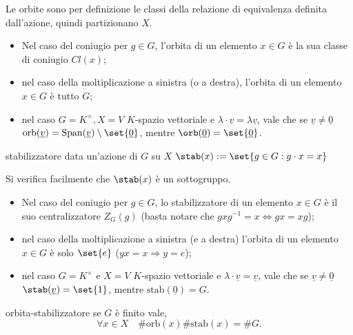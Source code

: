 Le orbite sono per definizione le classi della relazione di equivalenza definita dall'azione, quindi partizionano $X$.
\begin{itemize}
    \item Nel caso del coniugio per $g \in G$, l'orbita di un elemento $x \in G$ è la sua classe di coniugio $Cl(x)$;
    \item nel caso della moltiplicazione a sinistra (o a destra), l'orbita di un elemento $x \in G$ è tutto $G$;
    \item nel caso $G = K^\times, X = V$ $K$-spazio vettoriale e $\lambda \cdot \underline{v} = \lambda\underline{v}$, vale che se $\underline{v} \neq \underline{0}$ $\text{orb}(\underline{v}) = \text{Span}(\underline{v}) \setminus \set{\underline{0}}$, mentre $\orb(\underline{0}) = \set{\underline{0}}$.
    \end{itemize}
\begin{definition}{stabilizzatore}
    data un'azione di $G$ su $X$ $\stab(x) := \set{g \in G : g \cdot x = x} $
\end{definition} 
Si verifica facilmente che $\stab(x)$ è un sottogruppo.
\begin{itemize}
    \item Nel caso del coniugio per $g \in G$, lo stabilizzatore di un elemento $x \in G$ è il suo centralizzatore $Z_G(g)$ (basta notare che $gxg^{-1} = x \Longleftrightarrow gx = xg$);
    \item nel caso della moltiplicazione a sinistra (e a destra) l'orbita di un elemento $x \in G$ è solo $\set{e}$ ($yx = x \Rightarrow y = e$);
    \item nel caso $G = K^\times$ e $X = V$ $K$-spazio vettoriale e $\lambda \cdot \underline{v} = \underline{v}$, vale che se $\underline{v} \neq \underline{0}$ $\stab(\underline{v}) = \set{1}$, mentre $\text{stab}(\underline{0}) = G$.
    \end{itemize}
\begin{lemma}{orbita-stabilizzatore}
    se $G$ è finito vale,
    \[
    \forall x \in X \quad \#\text{orb}(x) \#\text{stab}(x) = \#G.
    \]
\end{lemma}
